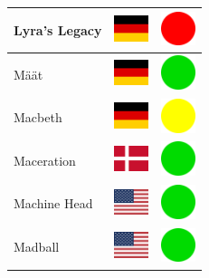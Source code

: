 \documentclass[12pt, a4paper, twoside]{report}
\begin{document}
\begin{center}
\begin{longtable}{|p{5cm}|p{2cm}|p{2cm}|}
 Lyra's Legacy                                              & \includegraphics[width=1cm]{4x3/de} &   \includegraphics[width=1cm]{likes/n} \\ \hline
 Määt                                                       & \includegraphics[width=1cm]{4x3/de} &   \includegraphics[width=1cm]{likes/y} \\ \hline
 Macbeth                                                    & \includegraphics[width=1cm]{4x3/de} &   \includegraphics[width=1cm]{likes/m} \\ \hline
 Maceration                                                 & \includegraphics[width=1cm]{4x3/dk} &   \includegraphics[width=1cm]{likes/y} \\ \hline
 Machine Head                                               & \includegraphics[width=1cm]{4x3/us} &   \includegraphics[width=1cm]{likes/y} \\ \hline
 Madball                                                    & \includegraphics[width=1cm]{4x3/us} &   \includegraphics[width=1cm]{likes/y} \\ \hline

\end{longtable}
\end{center}
\end{document}
